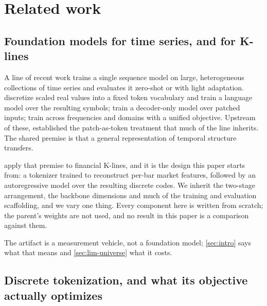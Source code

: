 %
\section{Related work}
\label{sec:related}

\subsection{Foundation models for time series, and for K-lines}
\label{sec:rel-foundation}

A line of recent work trains a single sequence model on large, heterogeneous collections of time
series and evaluates it zero-shot or with light adaptation. \citet{ansari2024chronos} discretize
scaled real values into a fixed token vocabulary and train a language model over the resulting
symbols; \citet{das2024timesfm} train a decoder-only model over patched inputs;
\citet{woo2024moirai} train across frequencies and domains with a unified objective. Upstream of
these, \citet{nie2023patchtst} established the patch-as-token treatment that much of the line
inherits. The shared premise is that a general representation of temporal structure transfers.

\citet{shi2025kronos} apply that premise to financial K-lines, and it is the design this paper
starts from: a tokenizer trained to reconstruct per-bar market features, followed by an
autoregressive model over the resulting discrete codes. We inherit the two-stage arrangement, the
backbone dimensions and much of the training and evaluation scaffolding, and we vary one thing.
Every component here is written from scratch; the parent's weights are not used, and no result in
this paper is a comparison against them.

The artifact is a measurement vehicle, not a foundation model; \cref{sec:intro} says what that means and \cref{sec:lim-universe} what it costs.

\subsection{Discrete tokenization, and what its objective actually optimizes}
\label{sec:rel-tokenization}

